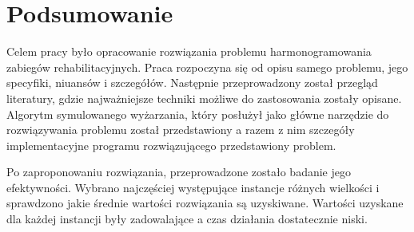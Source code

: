 \chapter{Podsumowanie}
Celem pracy było opracowanie rozwiązania problemu harmonogramowania zabiegów
rehabilitacyjnych. Praca rozpoczyna się od opisu samego problemu, jego
specyfiki, niuansów i szczegółów. Następnie przeprowadzony został przegląd
literatury, gdzie najważniejsze techniki możliwe do zastosowania zostały
opisane. Algorytm symulowanego wyżarzania, który posłużył jako główne narzędzie
do rozwiązywania problemu został przedstawiony a razem z nim szczegóły
implementacyjne programu rozwiązującego przedstawiony problem.

Po zaproponowaniu rozwiązania, przeprowadzone zostało badanie jego efektywności.
Wybrano najczęściej występujące instancje różnych wielkości i sprawdzono jakie
średnie wartości rozwiązania są uzyskiwane. Wartości uzyskane dla każdej
instancji były zadowalające a czas działania dostatecznie niski.
